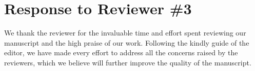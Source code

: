 \begin{sloppypar}
\section{Response to Reviewer \#3}

We thank the reviewer for the invaluable time and effort spent reviewing our manuscript and the high praise of our work. Following the kindly guide of the editor, we have made every effort to address all the concerns raised by the reviewers, which we believe will further improve the quality of the manuscript. 

% 
%
\end{sloppypar}
